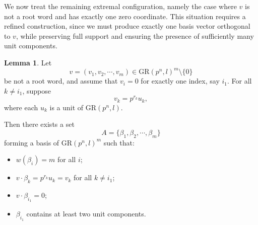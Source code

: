 \documentclass[10pt]{article}
\theoremstyle{definition}
\newtheorem{lemma}[lem]{Lemma}
\begin{document}
\medskip

We now treat the remaining extremal configuration, namely the case
where $v$ is not a root word and has exactly one zero coordinate.
This situation requires a refined construction, since we must
produce exactly one basis vector orthogonal to $v$, while preserving
full support and ensuring the presence of sufficiently many unit
components.

\begin{lemma}\label{Lemma 24}
Let
\[
v=(v_1,v_2,\cdots,v_m)\in \mathrm{GR}(p^n,l)^m\setminus\{0\}
\]
be not a root word, and assume that $v_i=0$ for exactly one index,
say $i_1$. For all $k\neq i_1$, suppose
\[
v_k=p^{r_k}u_k,
\]
where each $u_k$ is a unit of $\mathrm{GR}(p^n,l)$.

Then there exists a set
\[
A=\{\beta_1,\beta_2,\cdots,\beta_m\}
\]
forming a basis of $\mathrm{GR}(p^n,l)^m$ such that:

\begin{itemize}
\item $w(\beta_i)=m$ for all $i$;
\item $v\cdot \beta_k=p^{r_k}u_k=v_k$ for all $k\neq i_1$;
\item $v\cdot \beta_{i_1}=0$;
\item $\beta_{i_1}$ contains at least two unit components.
\end{itemize}
\end{lemma}
\end{document}
